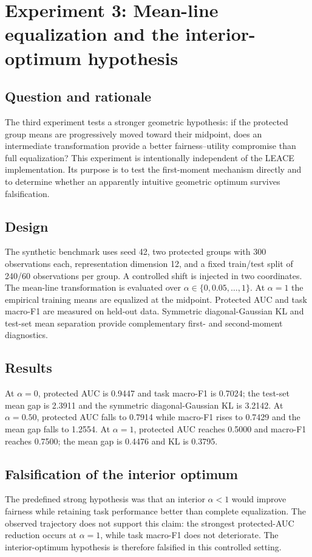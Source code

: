 \section{Experiment 3: Mean-line equalization and the interior-optimum hypothesis}
\label{sec:mean-line}

\subsection{Question and rationale}
The third experiment tests a stronger geometric hypothesis: if the protected group means are progressively moved toward their midpoint, does an intermediate transformation provide a better fairness--utility compromise than full equalization? This experiment is intentionally independent of the LEACE implementation. Its purpose is to test the first-moment mechanism directly and to determine whether an apparently intuitive geometric optimum survives falsification.

\subsection{Design}
The synthetic benchmark uses seed 42, two protected groups with 300 observations each, representation dimension 12, and a fixed train/test split of 240/60 observations per group. A controlled shift is injected in two coordinates. The mean-line transformation is evaluated over $\alpha\in\{0,0.05,\ldots,1\}$. At $\alpha=1$ the empirical training means are equalized at the midpoint. Protected AUC and task macro-F1 are measured on held-out data. Symmetric diagonal-Gaussian KL and test-set mean separation provide complementary first- and second-moment diagnostics.

\subsection{Results}
At $\alpha=0$, protected AUC is 0.9447 and task macro-F1 is 0.7024; the test-set mean gap is 2.3911 and the symmetric diagonal-Gaussian KL is 3.2142. At $\alpha=0.50$, protected AUC falls to 0.7914 while macro-F1 rises to 0.7429 and the mean gap falls to 1.2554. At $\alpha=1$, protected AUC reaches 0.5000 and macro-F1 reaches 0.7500; the mean gap is 0.4476 and KL is 0.3795.

\subsection{Falsification of the interior optimum}
The predefined strong hypothesis was that an interior $\alpha<1$ would improve fairness while retaining task performance better than complete equalization. The observed trajectory does not support this claim: the strongest protected-AUC reduction occurs at $\alpha=1$, while task macro-F1 does not deteriorate. The interior-optimum hypothesis is therefore falsified in this controlled setting.

